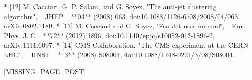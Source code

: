 * [12] M. Cacciari, G. P. Salam, and G. Soyez, "The anti-jet clustering algorithm", _JHEP_ **04** (2008) 063, doi:10.1088/1126-6708/2008/04/063, arXiv:0802.1189.
* [13] M. Cacciari and G. Soyez, "FastJet user manual", _Eur. Phys. J. C_ **72** (2012) 1896, doi:10.1140/epjc/s10052-012-1896-2, arXiv:1111.6097.
* [14] CMS Collaboration, "The CMS experiment at the CERN LHC", _JINST_ **3** (2008) S08004, doi:10.1088/1748-0221/3/08/S08004.

[MISSING_PAGE_POST]

 